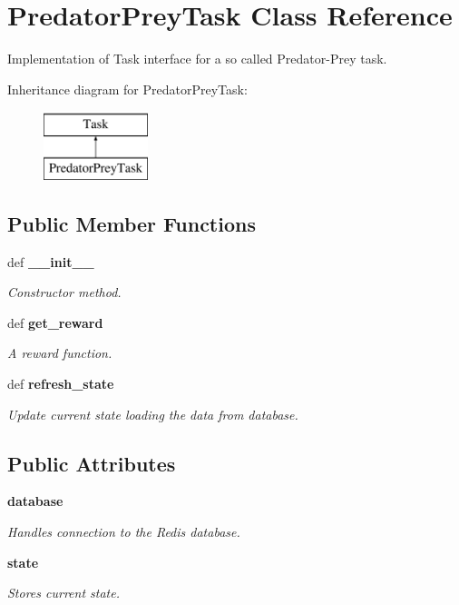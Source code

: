 \section{Predator\+Prey\+Task Class Reference}
\label{a00005}


Implementation of Task interface for a so called Predator-\/\+Prey task.  


Inheritance diagram for Predator\+Prey\+Task\+:\begin{figure}[H]
\begin{center}
\leavevmode
\includegraphics[height=2.000000cm]{a00005}
\end{center}
\end{figure}
\subsection*{Public Member Functions}
\begin{DoxyCompactItemize}
\item 
def {\bf \+\_\+\+\_\+init\+\_\+\+\_\+}\label{a00005_ac775ee34451fdfa742b318538164070e}

\begin{DoxyCompactList}\small\item\em Constructor method. \end{DoxyCompactList}\item 
def {\bf get\+\_\+reward}
\begin{DoxyCompactList}\small\item\em A reward function. \end{DoxyCompactList}\item 
def {\bf refresh\+\_\+state}
\begin{DoxyCompactList}\small\item\em Update current state loading the data from database. \end{DoxyCompactList}\end{DoxyCompactItemize}
\subsection*{Public Attributes}
\begin{DoxyCompactItemize}
\item 
{\bf database}\label{a00005_a64dbaa3229ec575b68ec333442e10cee}

\begin{DoxyCompactList}\small\item\em Handles connection to the Redis database. \end{DoxyCompactList}\item 
{\bf state}\label{a00005_adc6e5733fc3c22f0a7b2914188c49c90}

\begin{DoxyCompactList}\small\item\em Stores current state. \end{DoxyCompactList}\end{DoxyCompactItemize}


